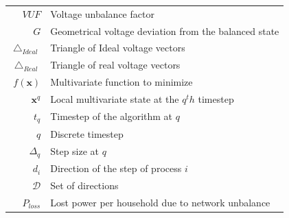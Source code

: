 		\begin{longtable}{r|l}
  $VUF$                             & Voltage unbalance factor\\
  $G$                               & Geometrical voltage deviation from the balanced state\\
  $\bigtriangleup_{Ideal}$          & Triangle of Ideal voltage vectors\\
  $\bigtriangleup_{Real}$           & Triangle of real voltage vectors\\
	$f(\textbf{x})$										& Multivariate function to minimize\\
  $\textbf{x}^{q}$                           & Local multivariate state at the $q^th$ timestep\\
  $t_q$                             & Timestep of the algorithm at $q$\\
  $q$                               & Discrete timestep\\
  $\Delta_q$                        & Step size at $q$\\
  $d_i$                             & Direction of the step of process $i$\\
	$\mathcal{D}$											& Set of directions\\
  $P_{loss}$                        & Lost power per household due to network unbalance\\

\end{longtable}
